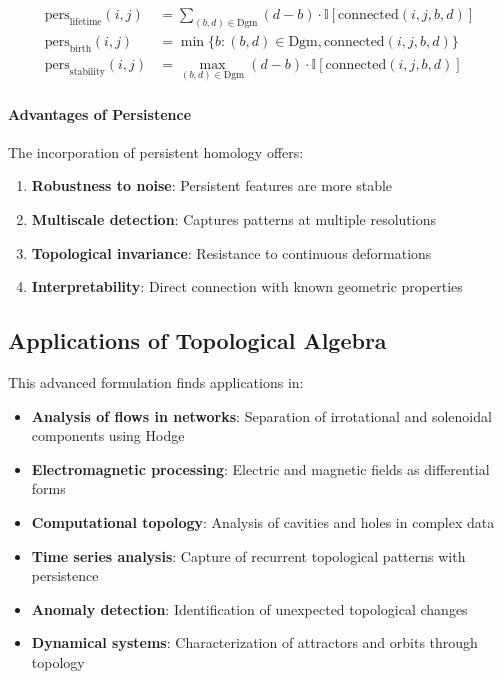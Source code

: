 \begin{align}
\text{pers}_{\text{lifetime}}(i,j) &= \sum_{(b,d) \in \text{Dgm}} (d-b) \cdot \mathbb{I}[\text{connected}(i,j,b,d)] \label{eq:lifetime_persistence} \\
\text{pers}_{\text{birth}}(i,j) &= \min\{b : (b,d) \in \text{Dgm}, \text{connected}(i,j,b,d)\} \\
\text{pers}_{\text{stability}}(i,j) &= \max_{(b,d) \in \text{Dgm}} (d-b) \cdot \mathbb{I}[\text{connected}(i,j,b,d)]
\end{align}

\paragraph{Advantages of Persistence}

The incorporation of persistent homology offers:

\begin{enumerate}
    \item \textbf{Robustness to noise}: Persistent features are more stable
    \item \textbf{Multiscale detection}: Captures patterns at multiple resolutions
    \item \textbf{Topological invariance}: Resistance to continuous deformations
    \item \textbf{Interpretability}: Direct connection with known geometric properties
\end{enumerate}

\subsection{Applications of Topological Algebra}

This advanced formulation finds applications in:

\begin{itemize}
    \item \textbf{Analysis of flows in networks}: Separation of irrotational and solenoidal components using Hodge
    \item \textbf{Electromagnetic processing}: Electric and magnetic fields as differential forms
    \item \textbf{Computational topology}: Analysis of cavities and holes in complex data
    \item \textbf{Time series analysis}: Capture of recurrent topological patterns with persistence
    \item \textbf{Anomaly detection}: Identification of unexpected topological changes
    \item \textbf{Dynamical systems}: Characterization of attractors and orbits through topology
\end{itemize}


